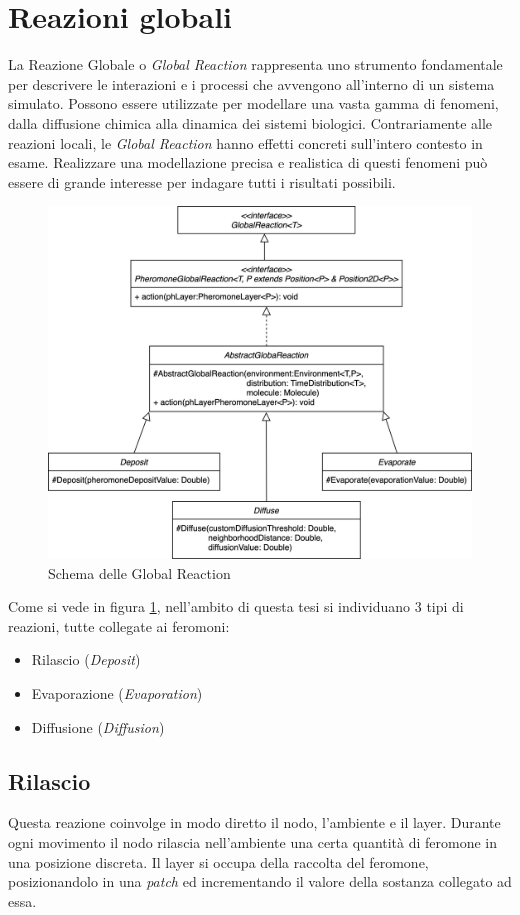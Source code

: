 \section{Reazioni globali}
La Reazione Globale o \textit{Global Reaction} rappresenta uno strumento fondamentale per descrivere
le interazioni e i processi che avvengono all'interno di un sistema simulato.
Possono essere utilizzate per modellare una vasta gamma di fenomeni, dalla diffusione chimica alla dinamica dei sistemi biologici.
Contrariamente alle reazioni locali, le \textit{Global Reaction} hanno effetti concreti sull'intero contesto in esame. 
Realizzare una modellazione precisa e realistica di questi fenomeni può essere di grande interesse per indagare tutti i risultati possibili.
\begin{figure}[ht]
    \centering
    \includegraphics[width=.7\linewidth]{figures/global.png}
    \caption{Schema delle Global Reaction }\label{fig:global}
\end{figure}\newline
Come si vede in figura \cref{fig:global}, nell'ambito di questa tesi si individuano 3 tipi di reazioni, tutte collegate ai feromoni:
\begin{itemize}
    \item Rilascio (\textit{Deposit})
    \item Evaporazione (\textit{Evaporation})
    \item Diffusione (\textit{Diffusion})
\end{itemize}
\subsection{Rilascio}
Questa reazione coinvolge in modo diretto il nodo, l'ambiente e il layer. Durante ogni movimento il nodo rilascia 
nell'ambiente una certa quantità di feromone in una posizione discreta. Il layer si occupa della raccolta del feromone,
posizionandolo in una \textit{patch} ed incrementando il valore della sostanza collegato ad essa.
